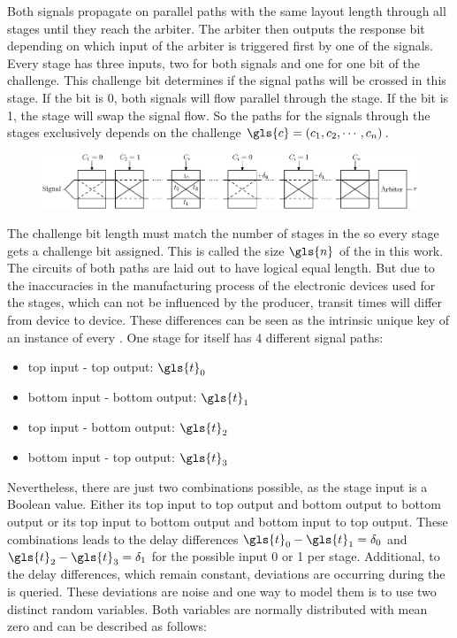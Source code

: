 Both signals propagate on parallel paths with the same layout length through all stages until they reach the arbiter.
The arbiter then outputs the response bit depending on which input of the arbiter is triggered first by one of the signals. %
Every stage has three inputs, two for both signals and one for one bit of the challenge.
This challenge bit determines if the signal paths will be crossed in this stage. %
If the bit is 0, both signals will flow parallel through the stage.
If the bit is 1, the stage will swap the signal flow.
So the paths for the signals through the stages exclusively depends on the challenge $\gls{c} = (c_1, c_2, \cdots, c_n)$.

\begin{figure}[ht]
\centering
\includegraphics[width=1.00\textwidth]{images/arbiter_puf.eps}
\caption{\apuf}
\label{fig:arbiter}
\end{figure}

The challenge bit length must match the number of stages in the \apuf so every stage gets a challenge bit assigned. 
This is called the size $\gls{n}$ of the \apuf in this work. %
The circuits of both paths are laid out to have logical equal length.
But due to the inaccuracies in the manufacturing process of the electronic devices used for the stages, which can not be influenced by the producer, transit times will differ from device to device.
These differences can be seen as the intrinsic unique key of an instance of every \apuf. %
One stage for itself has 4 different signal paths: 

\begin{itemize}
\item top input - top output: $\gls{t}_0$
\item bottom input - bottom output: $\gls{t}_1$
\item top input - bottom output: $\gls{t}_2$
\item bottom input - top output: $\gls{t}_3$
\end{itemize}

Nevertheless, there are just two combinations possible, as the stage input is a Boolean value.
Either its top input to top output and bottom output to bottom output or its top input to bottom output and bottom input to top output.
These combinations leads to the delay differences $\gls{t}_0 - \gls{t}_1 = \delta_0$ and $\gls{t}_2 - \gls{t}_3 = \delta_1$ for the possible input 0 or 1 per stage. %
Additional, to the delay differences, which remain constant, deviations are occurring during the \apuf is queried.
These deviations are noise and one way to model them is to use two distinct random variables.
Both variables are normally distributed with mean zero and can be described as follows:

